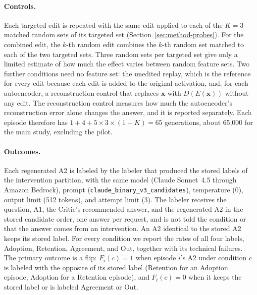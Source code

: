 \paragraph{Controls.} Each targeted edit is repeated with the same edit
applied to each of the $K = 3$ matched random sets of its targeted set
(Section~\ref{sec:method-probes}). For the combined edit, the $k$-th random
edit combines the $k$-th random set matched to each of the two targeted sets.
Three random sets per targeted set give only a limited estimate of how much
the effect varies between random feature sets. Two further conditions need no
feature set: the unedited replay, which is the reference for every edit
because each edit is added to the original activation, and, for each
autoencoder, a reconstruction control that replaces $\mathbf{x}$ with
$D(E(\mathbf{x}))$ without any edit. The reconstruction control measures how
much the autoencoder's reconstruction error alone changes the answer, and it
is reported separately. Each episode therefore has
$1 + 4 + 5 \times 3 \times (1 + K) = 65$ generations, about 65{,}000 for the
main study, excluding the pilot.

\paragraph{Outcomes.} Each regenerated A2 is labeled by the labeler that
produced the stored labels of the intervention partition, with the same model
(Claude Sonnet~4.5 through Amazon Bedrock), prompt
(\texttt{claude\_binary\_v3\_candidates}), temperature (0), output limit (512
tokens), and attempt limit (3). The labeler receives the question, A1, the
Critic's recommended answer, and the regenerated A2 in the stored candidate
order, one answer per request, and is not told the condition or that the
answer comes from an intervention. An A2 identical to the stored A2 keeps its
stored label. For every condition we report the rates of all four labels,
Adoption, Retention, Agreement, and Out, together with its technical failures.
The primary outcome is a flip: $F_i(c) = 1$ when episode $i$'s A2 under
condition $c$ is labeled with the opposite of its stored label (Retention for
an Adoption episode, Adoption for a Retention episode), and $F_i(c) = 0$ when
it keeps the stored label or is labeled Agreement or Out.

